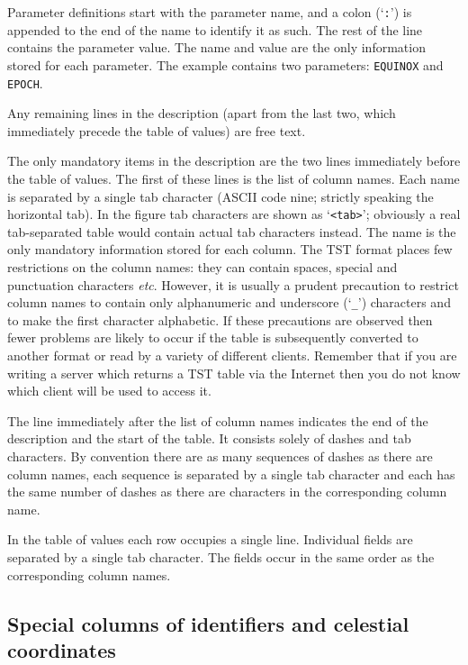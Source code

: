 \documentclass[twoside,11pt,nolof,chapters]{starlink}
\begin{document}
Parameter definitions start with the parameter name, and a colon (`\texttt{:}')
is appended to the end of the name to identify it as such.  The rest of
the line contains the parameter value.  The name and value are the only
information stored for each parameter.  The example contains two
parameters: \texttt{EQUINOX} and \texttt{EPOCH}.

Any remaining lines in the description (apart from the last two, which
immediately precede the table of values) are free text.

The only mandatory items in the description are the two lines immediately
before the table of values.  The first of these lines is the list of column
names.  Each name is separated by a single tab character (ASCII code nine;
strictly speaking the horizontal tab).  In the figure tab characters are
shown as `\texttt{<tab>}'; obviously a real tab-separated table would contain
actual tab characters instead.  The name is the only mandatory information
stored for each column.  The TST format places few restrictions on the
column names: they can contain spaces, special and punctuation characters
\emph{etc}.  However, it is usually a prudent precaution to restrict
column names to contain only alphanumeric and underscore (`\texttt{\_}')
characters and to make the first character alphabetic.  If these
precautions are observed then fewer problems are likely to occur if the
table is subsequently converted to another format or read by a variety
of different clients.  Remember that if you are writing a server which
returns a TST table via the Internet then you do not know which client
will be used to access it.

The line immediately after the list of column names indicates the end of
the description and the start of the table.  It consists solely of dashes
and tab characters.  By convention there are as many sequences of dashes
as there are column names, each sequence is separated by a single tab
character and each has the same number of dashes as there are characters
in the corresponding column name.

In the table of values each row occupies a single line.  Individual fields
are separated by a single tab character.  The fields occur in the same
order as the corresponding column names.

\subsection{\label{TSTSPCOL_R}Special columns of identifiers and
celestial coordinates}
\end{document}
